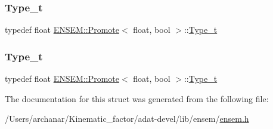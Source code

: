 \mbox{\label{structENSEM_1_1Promote_3_01float_00_01bool_01_4_a6f3eae0e5a64ff95586a8924ebccb856}} 
\subsubsection{\texorpdfstring{Type\_t}{Type\_t}\hspace{0.1cm}{\footnotesize\ttfamily [2/3]}}
{\footnotesize\ttfamily typedef float \mbox{\hyperlink{structENSEM_1_1Promote}{E\+N\+S\+E\+M\+::\+Promote}}$<$ float, bool $>$\+::\mbox{\hyperlink{structENSEM_1_1Promote_3_01float_00_01bool_01_4_a6f3eae0e5a64ff95586a8924ebccb856}{Type\+\_\+t}}}

\mbox{\label{structENSEM_1_1Promote_3_01float_00_01bool_01_4_a6f3eae0e5a64ff95586a8924ebccb856}} 
\subsubsection{\texorpdfstring{Type\_t}{Type\_t}\hspace{0.1cm}{\footnotesize\ttfamily [3/3]}}
{\footnotesize\ttfamily typedef float \mbox{\hyperlink{structENSEM_1_1Promote}{E\+N\+S\+E\+M\+::\+Promote}}$<$ float, bool $>$\+::\mbox{\hyperlink{structENSEM_1_1Promote_3_01float_00_01bool_01_4_a6f3eae0e5a64ff95586a8924ebccb856}{Type\+\_\+t}}}



The documentation for this struct was generated from the following file\+:\begin{DoxyCompactItemize}
\item 
/\+Users/archanar/\+Kinematic\+\_\+factor/adat-\/devel/lib/ensem/\mbox{\hyperlink{adat-devel_2lib_2ensem_2ensem_8h}{ensem.\+h}}\end{DoxyCompactItemize}
